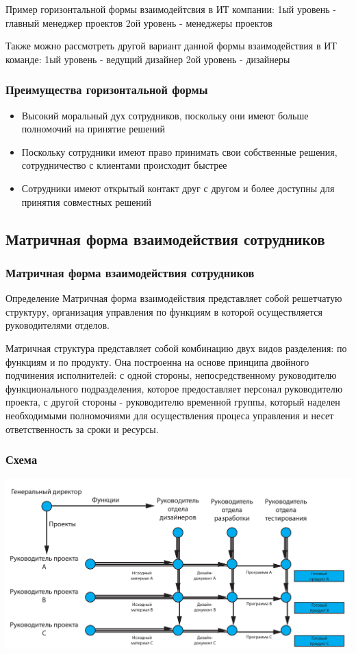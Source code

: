 \documentclass{../industrial-development}
\begin{document}
\lecturenotes
Пример горизонтальной формы взаимодейтсвия в ИТ компании:
1ый уровень - главный менеджер проектов
2ой уровень - менеджеры проектов

Также можно рассмотреть другой вариант данной формы взаимодействия в ИТ команде:
1ый уровень -  ведущий дизайнер
2ой уровень - дизайнеры

\begin{frame} \frametitle{Преимущества горизонтальной формы}
  
  \begin{itemize}
  \item Высокий моральный дух сотрудников, поскольку они имеют больше полномочий на принятие решений
  \item Поскольку сотрудники  имеют право принимать свои собственные решения, сотрудничество с клиентами происходит быстрее
  \item Сотрудники имеют открытый контакт друг с другом и более доступны для принятия совместных решений
  \end{itemize}
\end{frame}

\subsection{Матричная форма взаимодействия сотрудников}

\begin{frame} \frametitle{Матричная форма взаимодействия сотрудников}
  \begin{block}{Определение}
	Матричная форма взаимодействия представляет собой решетчатую структуру, организация управления по функциям в которой осуществляется руководителями отделов.
  \end{block}
\end{frame}

\lecturenotes
Матричная структура представляет собой комбинацию двух видов разделения: по функциям и по продукту. Она построенна на основе принципа двойного подчинения исполнителей: с одной стороны, непосредственному руководителю функционального подразделения, которое предоставляет персонал руководителю проекта, с другой стороны  - руководителю временной группы, который наделен необходимыми полномочиями для осуществления процеса управления и несет ответственность за сроки и ресурсы.

\begin{frame} \frametitle{Схема}

\centerline{\includegraphics[width=1\textwidth]{matrix.pdf}}

\end{frame}
\end{document}

